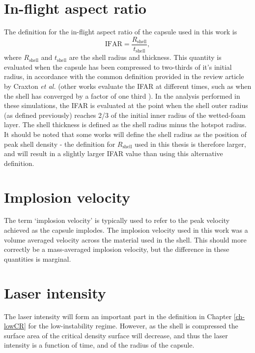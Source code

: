 \section{In-flight aspect ratio}

The definition for the in-flight aspect ratio of the capsule used in this work is \begin{equation} \mathrm{IFAR} = \frac{R_\mathrm{shell}}{t_\mathrm{shell}}, \end{equation}
where $R_\mathrm{shell}$ and $t_\mathrm{shell}$ are the shell radius and thickness. This quantity is evaluated when the capsule has been compressed to two-thirds of it's initial radius, in accordance with the common definition provided in the review article by Craxton \textit{et al.} \cite{Craxton2015} (other works evaluate the IFAR at different times, such as when the shell has converged by a factor of one third \cite{Radha2011}). In the analysis performed in these simulations, the IFAR is evaluated at the point when the shell outer radius (as defined previously) reaches 2/3 of the initial inner radius of the wetted-foam layer. The shell thickness is defined as the shell radius minus the hotspot radius. It should be noted that some works will define the shell radius as the position of peak shell density - the definition for $R_\mathrm{shell}$ used in this thesis is therefore larger, and will result in a slightly larger IFAR value than using this alternative definition.

\section{Implosion velocity}

The term `implosion velocity' is typically used to refer to the peak velocity achieved as the capsule implodes. The implosion velocity used in this work was a volume averaged velocity across the material used in the shell. This should more correctly be a mass-averaged implosion velocity, but the difference in these quantities is marginal. 

\section{Laser intensity}

The laser intensity will form an important part in the definition in Chapter \ref{ch-lowCR} for the low-instability regime. However, as the shell is compressed the surface area of the critical density surface will decrease, and thus the laser intensity is a function of time, and of the radius of the capsule. 

